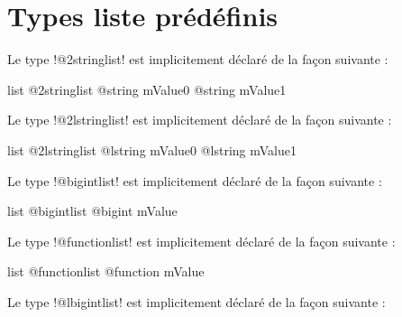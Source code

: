 \section{Types liste prédéfinis}


Le type \ggsq!@2stringlist! est implicitement déclaré de la façon suivante :

\begin{galgas4box}
list @2stringlist {
  @string mValue0
  @string mValue1
}
\end{galgas4box}









Le type \ggsq!@2lstringlist! est implicitement déclaré de la façon suivante :

\begin{galgas4box}
list @2lstringlist {
  @lstring mValue0
  @lstring mValue1
}
\end{galgas4box}









Le type \ggsq!@bigintlist! est implicitement déclaré de la façon suivante :

\begin{galgas4box}
list @bigintlist {
  @bigint mValue
}
\end{galgas4box}









Le type \ggsq!@functionlist! est implicitement déclaré de la façon suivante :

\begin{galgas4box}
list @functionlist {
  @function mValue
}
\end{galgas4box}









Le type \ggsq!@lbigintlist! est implicitement déclaré de la façon suivante :

